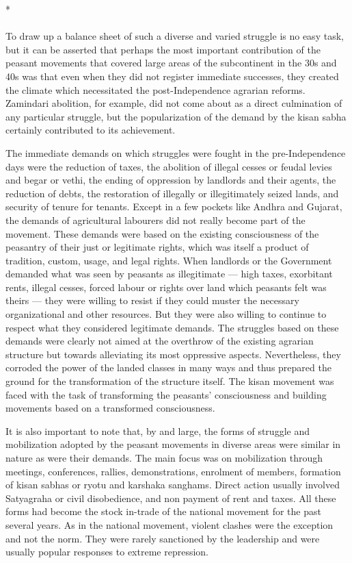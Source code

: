 \begin{center}*\end{center}

\paragraph*{}


To draw up a balance sheet of such a diverse and varied struggle is no easy task, but it can be asserted that perhaps the most important contribution of the peasant movements that covered large areas of the subcontinent in the 30s and 40s was that even when they did not register immediate successes, they created the climate which necessitated the post-Independence agrarian reforms. Zamindari abolition, for example, did not come about as a direct culmination of any particular struggle, but the popularization of the demand by the kisan sabha certainly contributed to its achievement.

The immediate demands on which struggles were fought in the pre-Independence days were the reduction of taxes, the abolition of illegal cesses or feudal levies and begar or vethi, the ending of oppression by landlords and their agents, the reduction of debts, the restoration of illegally or illegitimately seized lands, and security of tenure for tenants. Except in a few pockets like Andhra and Gujarat, the demands of agricultural labourers did not really become part of the movement. These demands were based on the existing consciousness of the peasantry of their just or legitimate rights, which was itself a product of tradition, custom, usage, and legal rights. When landlords or the Government demanded what was seen by peasants as illegitimate — high taxes, exorbitant rents, illegal cesses, forced labour or rights over land which peasants felt was theirs — they were willing to resist if they could muster the necessary organizational and other resources. But they were also willing to continue to respect what they considered legitimate demands. The struggles based on these demands were clearly not aimed at the overthrow of the existing agrarian structure but towards alleviating its most oppressive aspects. Nevertheless, they corroded the power of the landed classes in many ways and thus prepared the ground for the transformation of the structure itself. The kisan movement was faced with the task of transforming the peasants' consciousness and building movements based on a transformed consciousness.

It is also important to note that, by and large, the forms of struggle and mobilization adopted by the peasant movements in diverse areas were similar in nature as were their demands. The main focus was on mobilization through meetings, conferences, rallies, demonstrations, enrolment of members, formation of kisan sabhas or ryotu and karshaka sanghams. Direct action usually involved Satyagraha or civil disobedience, and non­ payment of rent and taxes. All these forms had become the stock­ in-trade of the national movement for the past several years. As in the national movement, violent clashes were the exception and not the norm. They were rarely sanctioned by the leadership and were usually popular responses to extreme repression.

